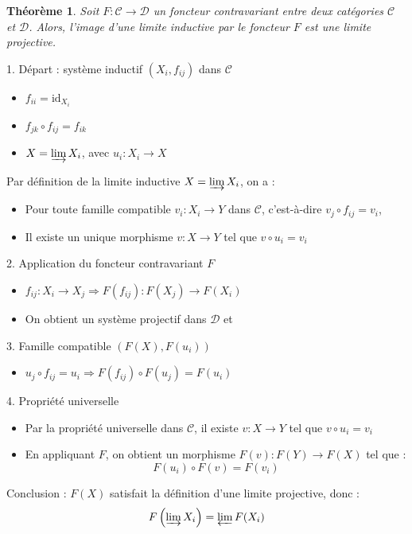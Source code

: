 \documentclass[9pt]{beamer}
\newtheorem{theoreme}{Théorème}
\begin{document}
\begin{frame}
 \begin{theoreme}
Soit \( F: \mathcal{C} \to \mathcal{D} \) un foncteur contravariant entre deux catégories \( \mathcal{C} \) et \( \mathcal{D} \). Alors, l'image d'une limite inductive par le foncteur $F$ est une limite projective.
 \end{theoreme}

	1. Départ : système inductif \((X_i, f_{ij})\) dans \( \mathcal{C} \)
\begin{itemize}
	\item \( f_{ii} = \text{id}_{X_i} \)
	\item \( f_{jk} \circ f_{ij} = f_{ik} \)
	\item \( X = \varinjlim X_i \), avec \( u_i: X_i \to X \)
\end{itemize}
Par définition de la limite inductive \( X = \varinjlim X_i \), on a :
\begin{itemize}
	\item Pour toute famille compatible \( v_i: X_i \to Y \) dans \( \mathcal{C} \), c’est-à-dire \( v_j \circ f_{ij} = v_i \),
	\item Il existe un unique morphisme \( v: X \to Y \) tel que \( v \circ u_i = v_i \)
\end{itemize}

2. Application du foncteur contravariant \( F \)
\begin{itemize}
	\item \( f_{ij}: X_i \to X_j \Rightarrow F(f_{ij}): F(X_j) \to F(X_i) \)
	\item On obtient un système projectif dans \( \mathcal{D} \) et 
\end{itemize}

3. Famille compatible \((F(X), F(u_i))\)
\begin{itemize}
	\item \( u_j \circ f_{ij} = u_i \Rightarrow F(f_{ij}) \circ F(u_j) = F(u_i) \)
\end{itemize}

\end{frame}


\begin{frame}
	4. Propriété universelle
\begin{itemize}
	\item Par la propriété universelle dans \( \mathcal{C} \), il existe \( v: X \to Y \) tel que \( v \circ u_i = v_i \)
	\item En appliquant \( F \), on obtient un morphisme \( F(v): F(Y) \to F(X) \) tel que :
	\[
	F(u_i) \circ F(v) = F(v_i)
	\]
\end{itemize}

	Conclusion : \( F(X) \) satisfait la définition d'une limite projective, donc :
\[
F\left( \varinjlim X_i \right) = \varprojlim F(X_i)
\]

\end{frame}
\end{document}
